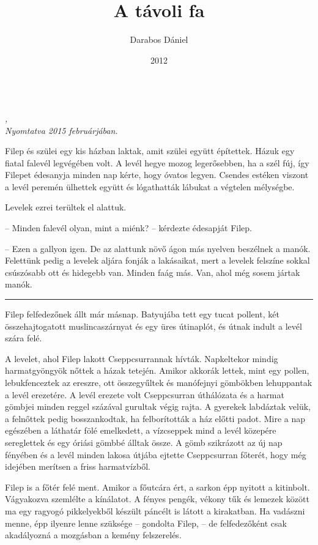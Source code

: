 \documentclass[10pt]{memoir}
\author{Darabos Dániel}
\date{2012}
\title{A távoli fa}
\renewcommand{\pfbreakdisplay}{\bigskip \ding{166} \bigskip}
\newcommand{\secbreak}{\fancybreak{\pfbreakdisplay}\indent}
\begin{document}
\begin{titlingpage}
  \centering
  \vspace*{0.2\textheight}
  {\Huge \thetitle}\\[\baselineskip]
  {\large\itshape \theauthor, \thedate}\\[\baselineskip]
  \vfill
  {\itshape 
  Nyomtatva 2015 februárjában.}
  \vspace*{0.1\textheight}
\end{titlingpage}

\vspace*{0.4\textheight}
Filep és szülei egy kis házban laktak, amit szülei együtt építettek. Házuk egy
fiatal falevél legvégében volt. A levél hegye mozog legerősebben, ha a szél
fúj, így Filepet édesanyja minden nap kérte, hogy óvatos legyen. Csendes
estéken viszont a levél peremén ülhettek együtt és lógathatták lábukat a
végtelen mélységbe.

Levelek ezrei terültek el alattuk.

-- Minden falevél olyan, mint a miénk? -- kérdezte édesapját Filep.

-- Ezen a gallyon igen. De az alattunk növő ágon más nyelven beszélnek a manók.
Felettünk pedig a levelek aljára fonják a lakásaikat, mert a levelek felszíne
sokkal csúszósabb ott és hidegebb van. Minden faág más. Van, ahol még sosem
jártak manók.

\secbreak

Filep felfedezőnek állt már másnap. Batyujába tett egy tucat pollent, két
összehajtogatott muslincaszárnyat és egy üres útinaplót, és útnak indult a
levél szára felé.

A levelet, ahol Filep lakott Cseppcsurrannak hívták. Napkeltekor mindig
harmatgyöngyök nőttek a házak tetején. Amikor akkorák lettek, mint egy pollen,
lebukfenceztek az ereszre, ott összegyűltek és manófejnyi gömbökben lehuppantak
a levél erezetére. A levél erezete volt Cseppcsurran úthálózata és a harmat
gömbjei minden reggel százával gurultak végig rajta. A gyerekek labdáztak
velük, a felnőttek pedig bosszankodtak, ha felborították a ház előtti padot.
Mire a nap egészében a láthatár fölé emelkedett, a vízcseppek mind a levél
közepére sereglettek és egy óriási gömbbé álltak össze. A gömb szikrázott az új
nap fényében és a levél minden lakosa útjába ejtette Cseppcsurran főterét, hogy
még idejében merítsen a friss harmatvízből.

Filep is a főtér felé ment. Amikor a főutcára ért, a sarkon épp nyitott a
kitinbolt. Vágyakozva szemlélte a kínálatot. A fényes pengék, vékony tűk és
lemezek között ma egy ragyogó pikkelyekből készült páncélt is látott a
kirakatban. Ha vadászni menne, épp ilyenre lenne szüksége -- gondolta Filep,
-- de felfedezőként csak akadályozná a mozgásban a kemény felszerelés.
\end{document}
